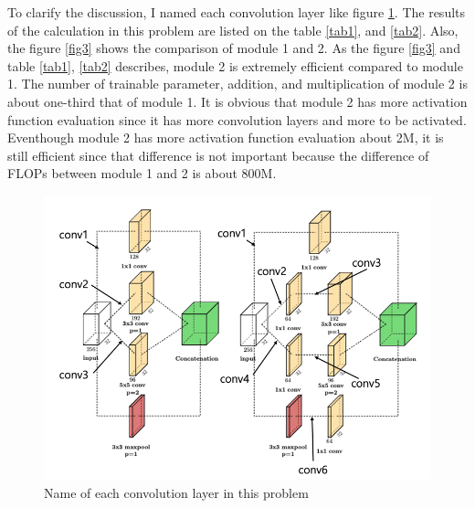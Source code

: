 \documentclass[10pt]{article}
\begin{document}
To clarify the discussion, I named each convolution layer like figure \ref{fig2}. The results of the calculation in this problem are listed on the table \ref{tab1}, and \ref{tab2}.
Also, the figure \ref{fig3} shows the comparison of module 1 and 2. As the figure \ref{fig3} and table \ref{tab1}, \ref{tab2} describes, module 2 is extremely efficient compared to module 1.
The number of trainable parameter, addition, and multiplication of module 2 is about one-third that of module 1. It is obvious that module 2 has more activation function evaluation since it has more convolution layers and more to be activated.
Eventhough module 2 has more activation function evaluation about 2M, it is still efficient since that difference is not important because the difference of FLOPs between module 1 and 2 is about 800M. 
\begin{figure}[!h]
    \begin{center}
        \includegraphics[scale = 0.5]{"./fig/conv.png"}
    \end{center}
    \label{fig2}
    \caption{Name of each convolution layer in this problem}
\end{figure}
\clearpage
\end{document}
